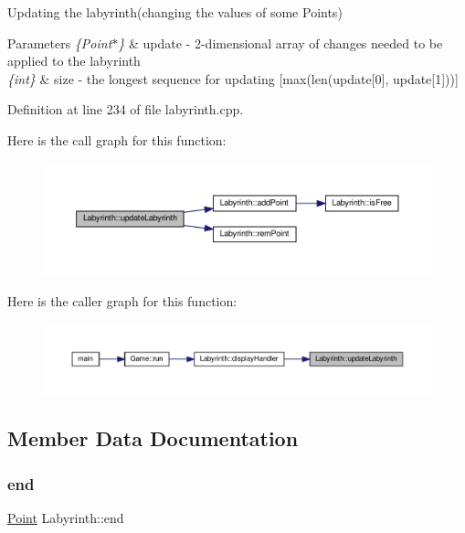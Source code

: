 Updating the labyrinth(changing the values of some Points) 
\begin{DoxyParams}{Parameters}
{\em \{\+Point$\ast$\}} & update -\/ 2-\/dimensional array of changes needed to be applied to the labyrinth \\
\hline
{\em \{int\}} & size -\/ the longest sequence for updating \mbox{[}max(len(update\mbox{[}0\mbox{]}, update\mbox{[}1\mbox{]}))\mbox{]} \\
\hline
\end{DoxyParams}


Definition at line 234 of file labyrinth.\+cpp.

Here is the call graph for this function\+:
\nopagebreak
\begin{figure}[H]
\begin{center}
\leavevmode
\includegraphics[width=350pt]{class_labyrinth_ad533aaa69e845e368a7a08097f7e4ac8_cgraph}
\end{center}
\end{figure}
Here is the caller graph for this function\+:
\nopagebreak
\begin{figure}[H]
\begin{center}
\leavevmode
\includegraphics[width=350pt]{class_labyrinth_ad533aaa69e845e368a7a08097f7e4ac8_icgraph}
\end{center}
\end{figure}


\subsection{Member Data Documentation}
\mbox{\label{class_labyrinth_a5536b8752cb3c2ef273360e14224bc6f}} 
\subsubsection{\texorpdfstring{end}{end}}
{\footnotesize\ttfamily \mbox{\hyperlink{common_8h_aa9cfdb80b4ca12013a2de8a3b9b97981}{Point}} Labyrinth\+::end\hspace{0.3cm}{\ttfamily [private]}}



